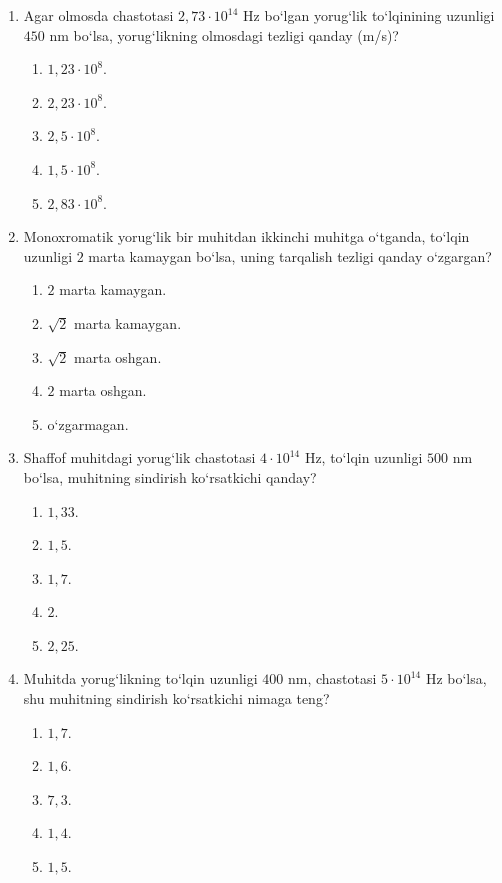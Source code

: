 \begin{enumerate}
\item Agar olmosda chastotasi $2,73\cdot10^{14}$ Hz bo‘lgan yorug‘lik to‘lqinining uzunligi $450$ nm bo‘lsa, yorug‘likning olmosdagi tezligi qanday (m/s)?
\begin{enumerate}[label=\Alph*)]
\item $1,23\cdot10^8$.
\item $2,23\cdot10^8$.
\item $2,5\cdot10^8$.
\item $1,5\cdot10^8$.
\item $2,83\cdot10^8$.
\end{enumerate}

\item Monoxromatik yorug‘lik bir muhitdan ikkinchi muhitga o‘tganda, to‘lqin uzunligi $2$ marta kamaygan bo‘lsa, uning tarqalish tezligi qanday o‘zgargan?
\begin{enumerate}[label=\Alph*)]
\item $2$ marta kamaygan.
\item $\sqrt{2}$ marta kamaygan.
\item $\sqrt{2}$ marta oshgan.
\item $2$ marta oshgan.
\item o‘zgarmagan.
\end{enumerate}

\item Shaffof muhitdagi yorug‘lik chastotasi $4\cdot10^{14}$ Hz, to‘lqin uzunligi $500$ nm bo‘lsa, muhitning sindirish ko‘rsatkichi qanday?
\begin{enumerate}[label=\Alph*)]
\item $1,33$.
\item $1,5$.
\item $1,7$.
\item $2$.
\item $2,25$.
\end{enumerate}

\item Muhitda yorug‘likning to‘lqin uzunligi $400$ nm, chastotasi $5\cdot10^{14}$ Hz bo‘lsa, shu muhitning sindirish ko‘rsatkichi nimaga teng?
\begin{enumerate}[label=\Alph*)]
\item $1,7$.
\item $1,6$.
\item $7,3$.
\item $1,4$.
\item $1,5$.
\end{enumerate}


\end{enumerate}
